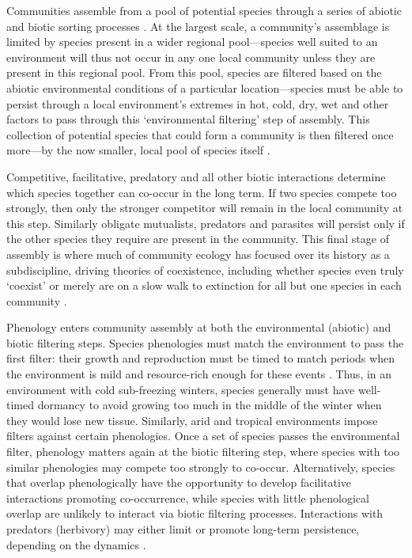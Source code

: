 \documentclass[11pt]{article}
\begin{document}
Communities assemble from a pool of potential species through a series of abiotic and biotic sorting processes \citep{hillerislambers2012rethinking}. At the largest scale, a community's assemblage is limited by species present in a wider regional pool---species well suited to an environment will thus not occur in any one local community unless they are present in this regional pool. From this pool, species are filtered based on the abiotic environmental conditions of a particular location---species must be able to persist through a local environment's extremes in hot, cold, dry, wet and other factors to pass through this `environmental filtering' step of assembly. This collection of potential species that could form a community is then filtered once more---by the now smaller, local pool of species itself \citep{hillerislambers2012rethinking}. 

Competitive, facilitative, predatory and all other biotic interactions determine which species together can co-occur in the long term. If two species compete too strongly, then only the stronger competitor will remain in the local community at this step. Similarly obligate mutualists, predators and parasites will persist only if the other species they require are present in the community. This final stage of assembly is where much of community ecology has focused over its history as a subdiscipline, driving theories of coexistence, including whether species even truly `coexist' or merely are on a slow walk to extinction for all but one species in each community \citep{Hubbell:2001vo}. 

Phenology enters community assembly at both the environmental (abiotic) and biotic filtering steps. Species phenologies must match the environment to pass the first filter: their growth and reproduction must be timed to match periods when the environment is mild and resource-rich enough for these events \citep{rathcke1985phenological}. Thus, in an environment with cold sub-freezing winters, species generally must have well-timed dormancy to avoid growing too much in the middle of the winter when they would lose new tissue. Similarly, arid and tropical environments impose filters against certain phenologies. Once a set of species passes the environmental filter, phenology matters again at the biotic filtering step, where species with too similar phenologies may compete too strongly to co-occur.  Alternatively, species that overlap phenologically have the opportunity to develop facilitative interactions \citep{duchenne2021phenological} promoting co-occurrence, while species with little phenological overlap are unlikely to interact via biotic filtering processes. Interactions with predators (herbivory) may either limit or promote long-term persistence, depending on the dynamics \citep[such dynamics relate in part to a larger literature on trophic synchrony, for which we refer readers to a number of recent reviews, e.g.][]{kharouba2018global,renner2018climate}.
\end{document}
